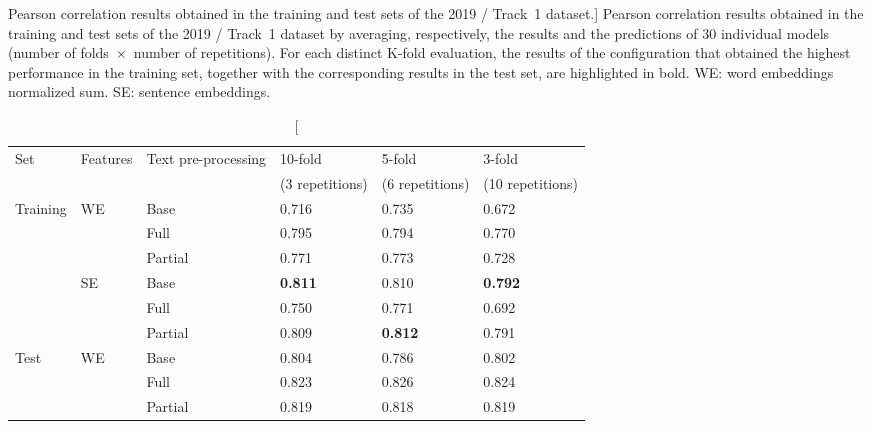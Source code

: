 \begingroup

\setlength\tabcolsep{4.0pt}

\begin{table}[!t]

\caption%
[Pearson correlation results obtained in the training and test sets of the 2019 / Track~1 dataset.]%
{Pearson correlation results obtained in the training and test sets of the 2019 / Track~1 dataset by averaging, respectively, the results and the predictions of 30 individual models (number of folds~$\times$~number of repetitions). For each distinct K-fold evaluation, the results of the configuration that obtained the highest performance in the training set, together with the corresponding results in the test set, are highlighted in bold. WE: word embeddings normalized sum. SE: sentence embeddings.}
\label{tab:2019-n2c2-results}

\centering

\small

\begin{tabular}{lllT{25mm}T{25mm}T{25mm}}

\toprule

Set & Features & Text pre-processing & 10-fold & 5-fold & 3-fold\\
& & & (3 repetitions) & (6 repetitions) & (10 repetitions)\\

\midrule

Training & WE & Base    & 0.716 & 0.735 & 0.672\\
         &    & Full    & 0.795 & 0.794 & 0.770\\
         &    & Partial & 0.771 & 0.773 & 0.728\\


& SE & Base    & \textbf{0.811} & 0.810          & \textbf{0.792}\\
&    & Full    & 0.750          & 0.771          & 0.692\\
&    & Partial & 0.809          & \textbf{0.812} & 0.791\\

\midrule

Test & WE & Base    & 0.804 & 0.786 & 0.802\\
     &    & Full    & 0.823 & 0.826 & 0.824\\
     &    & Partial & 0.819 & 0.818 & 0.819\\


\end{tabular}
\end{table}
